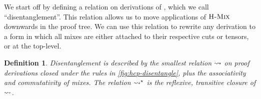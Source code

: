 \documentclass[submission,copyright,creativecommons]{eptcs}
\newtheorem{definition}[lemma]{Definition}
\begin{document}
We start off by defining a relation on derivations of \hcp, which we call ``disentanglement''. This relation allows us to move applications of $\textsc{H-Mix}$ downwards in the proof tree. We can use this relation to rewrite any derivation to a form in which all mixes are either attached to their respective cuts or tensors, or at the top-level.
\begin{definition}\label{def:hcp-disentangle}
  Disentanglement is described by the smallest relation $\leadsto$ on proof derivations closed under the rules in \cref{fig:hcp-disentangle}, plus the associativity and commutativity of mixes. The relation $\leadsto^\star$ is the reflexive, transitive closure of $\leadsto$.
\end{definition}\noindent
{}
\end{document}
